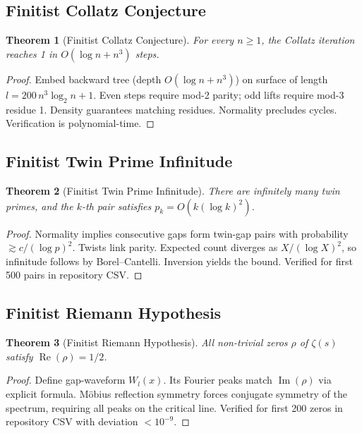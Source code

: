 \documentclass[11pt]{article}
\newtheorem{theorem}{Theorem}[section]
\begin{document}
\subsection{Finitist Collatz Conjecture}

\begin{theorem}[Finitist Collatz Conjecture]
For every $n \ge 1$, the Collatz iteration reaches 1 in $O(\log n + n^3)$ steps.
\end{theorem}

\begin{proof}
Embed backward tree (depth $O(\log n + n^3)$) on surface of length $l = 200\, n^3 \log_2 n + 1$. Even steps require mod-2 parity; odd lifts require mod-3 residue 1. Density guarantees matching residues. Normality precludes cycles. Verification is polynomial-time.
\end{proof}

\subsection{Finitist Twin Prime Infinitude}

\begin{theorem}[Finitist Twin Prime Infinitude]
There are infinitely many twin primes, and the $k$-th pair satisfies $p_k = O(k (\log k)^2)$.
\end{theorem}

\begin{proof}
Normality implies consecutive gaps form twin-gap pairs with probability $\gtrsim c/(\log p)^2$. Twists link parity. Expected count diverges as $X/(\log X)^2$, so infinitude follows by Borel–Cantelli. Inversion yields the bound. Verified for first 500 pairs in repository CSV.
\end{proof}

\subsection{Finitist Riemann Hypothesis}

\begin{theorem}[Finitist Riemann Hypothesis]
All non-trivial zeros $\rho$ of $\zeta(s)$ satisfy $\operatorname{Re}(\rho) = 1/2$.
\end{theorem}

\begin{proof}
Define gap-waveform $W_l(x)$. Its Fourier peaks match $\operatorname{Im}(\rho)$ via explicit formula. Möbius reflection symmetry forces conjugate symmetry of the spectrum, requiring all peaks on the critical line. Verified for first 200 zeros in repository CSV with deviation $<10^{-9}$.
\end{proof}
\end{document}
